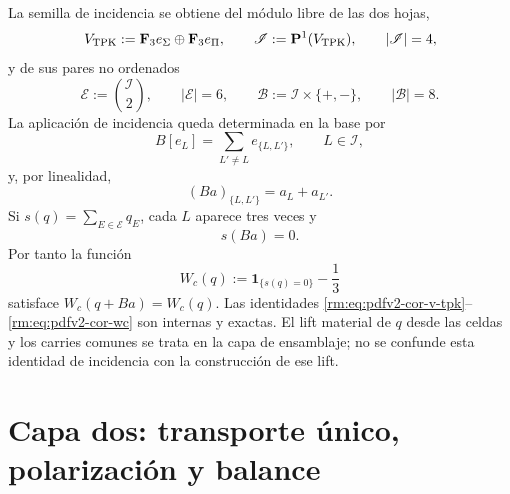La semilla de incidencia se obtiene del módulo libre de las dos hojas,
\begin{equation}
\label{rm:eq:pdfv2-cor-v-tpk}
 V_{\rm TPK}:=\mathbf F_3e_\Sigma\oplus\mathbf F_3e_\Pi,
 \qquad
 \mathscr I:=\mathbf P^1(V_{\rm TPK}),
 \qquad |\mathscr I|=4,
\end{equation}
y de sus pares no ordenados
\begin{equation}
\label{rm:eq:pdfv2-cor-incidencias}
 \mathscr E:=\binom{\mathscr I}{2},
 \qquad |\mathscr E|=6,
 \qquad
 \mathscr B:=\mathscr I\times\{+,-\},
 \qquad |\mathscr B|=8.
\end{equation}
La aplicación de incidencia queda determinada en la base por
\begin{equation}
\label{rm:eq:pdfv2-cor-b-incidencia-generadores}
 B[e_L]=\sum_{L'\neq L}e_{\{L,L'\}},
 \qquad L\in\mathscr I,
\end{equation}
y, por linealidad,
\begin{equation}
\label{rm:eq:pdfv2-cor-b-incidencia-coordenadas}
 (Ba)_{\{L,L'\}}=a_L+a_{L'}.
\end{equation}
Si \(s(q)=\sum_{E\in\mathscr E}q_E\), cada \(L\) aparece tres veces y
\begin{equation}
\label{rm:eq:pdfv2-cor-sb-cero}
 s(Ba)=0.
\end{equation}
Por tanto la función
\begin{equation}
\label{rm:eq:pdfv2-cor-wc}
 W_c(q):=\mathbf1_{\{s(q)=0\}}-\frac13
\end{equation}
satisface \(W_c(q+Ba)=W_c(q)\). Las identidades
\eqref{rm:eq:pdfv2-cor-v-tpk}--\eqref{rm:eq:pdfv2-cor-wc} son internas y exactas.
El lift material de \(q\) desde las celdas y los carries comunes se trata en
la capa de ensamblaje; no se confunde esta identidad de incidencia con la
construcción de ese lift.

\section{Capa dos: transporte único, polarización y balance}

